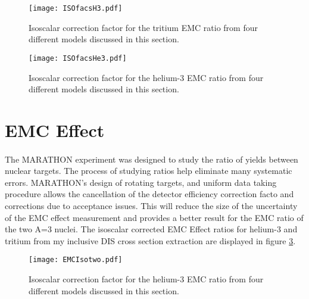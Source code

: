 	\begin{figure}[t]
		\texttt{[image: ISOfacsH3.pdf]}
		\caption{Isoscalar correction factor for the tritium EMC ratio from four different models discussed in this section.}
		\label{isofuncs}
	\end{figure}
	\begin{figure}
		\texttt{[image: ISOfacsHe3.pdf]}
		\caption{Isoscalar correction factor for the helium-3 EMC ratio from four different models discussed in this section.}
		\label{isofuncsHe3}
	\end{figure}

\section{EMC Effect}
\paragraph{} The MARATHON experiment was designed to study the ratio of yields between nuclear targets. The process of studying ratios help eliminate many systematic errors. MARATHON's design of rotating targets, and uniform data taking procedure allows the cancellation of the detector efficiency correction facto and corrections due to acceptance issues. This will reduce the size of the uncertainty of the EMC effect measurement and provides a better result for the EMC ratio of the two A=3 nuclei. The isoscalar corrected EMC Effect ratios for helium-3 and tritium from my inclusive DIS cross section extraction are displayed in figure \ref{ISOEMC_B}.   

	\begin{figure}
		\texttt{[image: EMCIsotwo.pdf]}
		\caption{Isoscalar correction factor for the helium-3 EMC ratio from four different models discussed in this section.}
		\label{ISOEMC_B}
	\end{figure}